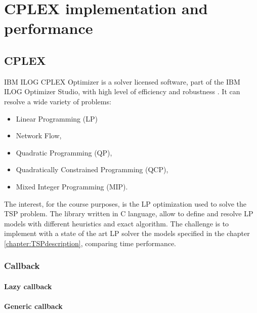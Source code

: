 \chapter{CPLEX implementation and performance}

\section{CPLEX}
IBM ILOG CPLEX Optimizer is a solver licensed software, part of the IBM ILOG Optimizer Studio, with high level of efficiency and robustness \cite{IBMILOGCPLEX}. It can resolve a wide variety of problems:
\begin{itemize}
	\item Linear Programming (LP)
	\item Network Flow,
	\item Quadratic Programming (QP),
	\item Quadratically Constrained Programming (QCP),
	\item Mixed Integer Programming (MIP).
\end{itemize}
The interest, for the course purposes, is the LP optimization used to solve the TSP problem. The library written in C language, allow to define and resolve LP models with different heuristics and exact algorithm. The challenge is to implement with a state of the art LP solver the models specified in the chapter \ref{chapter:TSPdescription}, comparing time performance. 

\subsection{Callback}
\subsubsection{Lazy callback}
\subsubsection{Generic callback}



